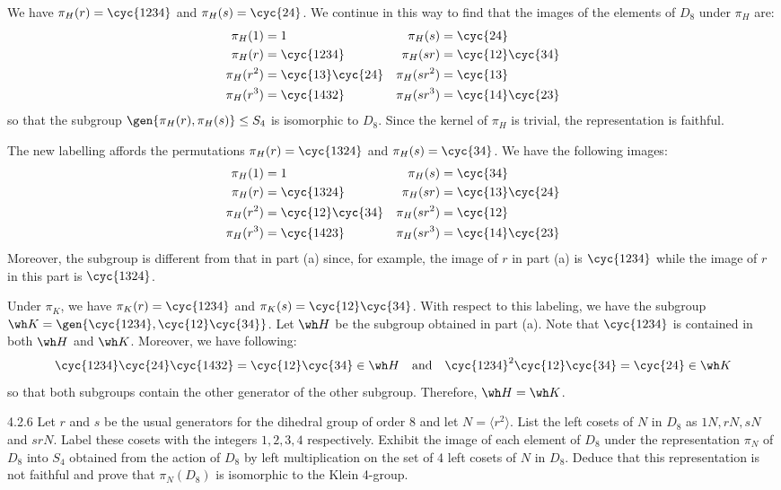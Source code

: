 \begin{solenum}
	\item We have $\pi_H(r) = \cyc{1 2 3 4}$ and $\pi_H(s) = \cyc{2 4}$.
	We continue in this way to find that the images of the elements of $D_8$ under $\pi_H$ are:
	\begin{align*}
		\pi_H(1) & = 1 & \pi_H(s) & = \cyc{2 4} \\
		\pi_H(r) & = \cyc{1 2 3 4} & \pi_H(sr) & = \cyc{1 2}\cyc{3 4} \\
		\pi_H(r^2) & = \cyc{1 3}\cyc{2 4} & \pi_H(sr^2) & = \cyc{1 3} \\
		\pi_H(r^3) & = \cyc{1 4 3 2} & \pi_H(sr^3) & = \cyc{1 4}\cyc{2 3}
	\end{align*}
	so that the subgroup $\gen{\pi_H(r), \pi_H(s)} \leq S_4$ is isomorphic to $D_8$.
	Since the kernel of $\pi_H$ is trivial, the representation is faithful.
	\item The new labelling affords the permutations $\pi_H(r) = \cyc{1 3 2 4}$ and $\pi_H(s) = \cyc{3 4}$.
	We have the following images:
	\begin{align*}
		\pi_H(1) & = 1 & \pi_H(s) & = \cyc{3 4} \\
		\pi_H(r) & = \cyc{1 3 2 4} & \pi_H(sr) & = \cyc{1 3}\cyc{2 4} \\
		\pi_H(r^2) & = \cyc{1 2}\cyc{3 4} & \pi_H(sr^2) & = \cyc{1 2} \\
		\pi_H(r^3) & = \cyc{1 4 2 3} & \pi_H(sr^3) & = \cyc{1 4}\cyc{2 3}
	\end{align*}
	Moreover, the subgroup is different from that in part (a) since, for example, the image of $r$ in part (a) is $\cyc{1 2 3 4}$ while the image of $r$ in this part is $\cyc{1 3 2 4}$.
	\item Under $\pi_K$, we have $\pi_K(r) = \cyc{1 2 3 4}$ and $\pi_K(s) = \cyc{1 2}\cyc{3 4}$.
	With respect to this labeling, we have the subgroup $\wh K = \gen{\cyc{1 2 3 4}, \cyc{1 2}\cyc{3 4}}$.
	Let $\wh H$ be the subgroup obtained in part (a).
	Note that $\cyc{1 2 3 4}$ is contained in both $\wh H$ and $\wh K$.
	Moreover, we have following:
	\[
		\cyc{1 2 3 4}\cyc{2 4}\cyc{1 4 3 2} = \cyc{1 2}\cyc{3 4} \in \wh H \quad \text{and} \quad \cyc{1 2 3 4}^2\cyc{1 2}\cyc{3 4} = \cyc{2 4} \in \wh K
	\]
	so that both subgroups contain the other generator of the other subgroup.
	Therefore, $\wh H = \wh K$.
\end{solenum}

\begin{exercise}{4.2.6}
	Let $r$ and $s$ be the usual generators for the dihedral group of order 8 and let $N = \langle r^2 \rangle$.
	List the left cosets of $N$ in $D_8$ as $1N, rN, sN$ and $srN$.
	Label these cosets with the integers $1,2,3,4$ respectively.
	Exhibit the image of each element of $D_8$ under the representation $\pi_N$ of $D_8$ into $S_4$ obtained from the action of $D_8$ by left multiplication on the set of 4 left cosets of $N$ in $D_8$.
	Deduce that this representation is not faithful and prove that $\pi_N(D_8)$ is isomorphic to the Klein 4-group.
\end{exercise}

